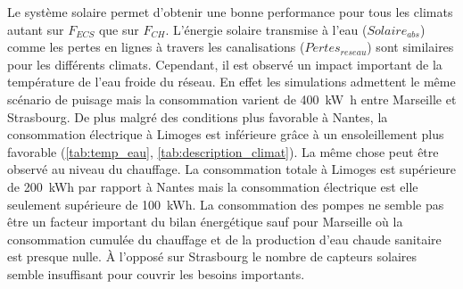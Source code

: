 Le système solaire permet d’obtenir une bonne performance pour tous les climats autant sur
$F_{ECS}$ que sur $F_{CH}$. L’énergie solaire transmise à l’eau ($Solaire_{abs}$) comme
les pertes en lignes à travers les canalisations ($Pertes_{reseau}$) sont similaires pour
les différents climats. Cependant, il est observé un impact important de la température
de l’eau froide du réseau. En effet les simulations admettent le même scénario de puisage
mais la consommation varient de \SI{400}{\kilo\watt\hour} entre Marseille et Strasbourg.
De plus malgré des conditions plus favorable à Nantes, la consommation électrique à
Limoges est inférieure grâce à un ensoleillement plus favorable (\autoref{tab:temp_eau},
\autoref{tab:description_climat}). La même chose peut être observé au niveau du chauffage.
La consommation totale à Limoges est supérieure de \SI{200}{kWh} par rapport à Nantes mais
la consommation électrique est elle seulement supérieure de \SI{100}{kWh}.
La consommation des pompes ne semble pas être un facteur important du bilan énergétique sauf pour
Marseille où la consommation cumulée du chauffage et de la
production d’eau chaude sanitaire est presque nulle. À l’opposé sur Strasbourg le nombre
de capteurs solaires semble insuffisant pour couvrir les besoins importants.

